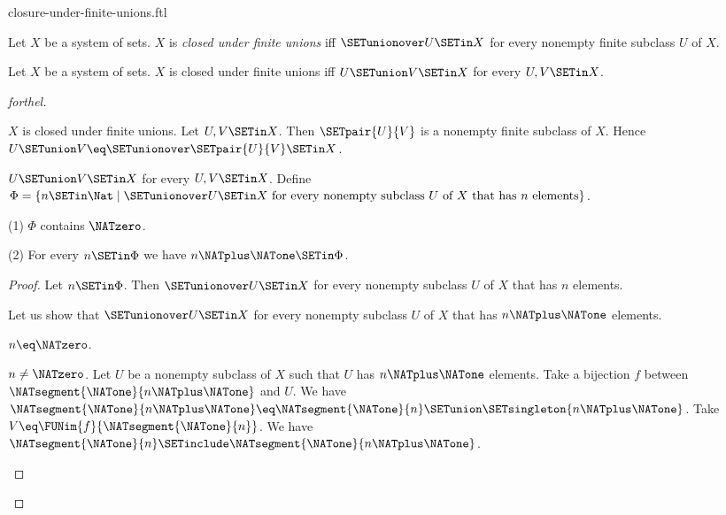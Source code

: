 \documentclass{naproche-library}
\begin{document}
\begin{smodule}[title=Closure Under Finite Unions]{closure-under-finite-unions.ftl}

\begin{definition}[forthel,id=FOUNDATIONS_14_7040118193913856]
  Let $X$ be a system of sets.
  $X$ is \emph{closed under finite unions} iff $\SETunionover U \SETin X$ for every nonempty finite subclass $U$ of $X$.
\end{definition}

\begin{proposition}[forthel,id=FOUNDATIONS_17_4164024962908160]
  Let $X$ be a system of sets.
  $X$ is closed under finite unions iff $U \SETunion V \SETin X$ for every $U, V \SETin X$.
\end{proposition}
\begin{proof}[forthel]
  \begin{case}{$X$ is closed under finite unions.}
    Let $U, V \SETin X$.
    Then $\SETpair{U}{V}$ is a nonempty finite subclass of $X$.
    Hence $U \SETunion V \eq \SETunionover \SETpair{U}{V} \SETin X$.
  \end{case}

  \begin{case}{$U \SETunion V \SETin X$ for every $U, V \SETin X$.}
    Define $\Phi = \{ n \SETin \Nat \mid \SETunionover U \SETin X\text{ for every nonempty subclass }U\text{ of }X\text{ that has }n\text{ elements}\}$.

    (1) $\Phi$ contains $\NATzero$.

    (2) For every $n \SETin \Phi$ we have $n \NATplus \NATone \SETin \Phi$.
    \begin{proof}
      Let $n \SETin \Phi$.
      Then $\SETunionover U \SETin X$ for every nonempty subclass $U$ of $X$ that has $n$ elements.

      Let us show that $\SETunionover U \SETin X$ for every nonempty subclass $U$ of $X$ that has $n \NATplus \NATone$ elements.

        \begin{case}{$n \eq \NATzero$.} \end{case}

        \begin{case}{$n \neq \NATzero$.}
          Let $U$ be a nonempty subclass of $X$ such that $U$ has $n \NATplus \NATone$ elements.
          Take a bijection $f$ between $\NATsegment{\NATone}{n \NATplus \NATone}$ and $U$.
          We have $\NATsegment{\NATone}{n \NATplus \NATone} \eq \NATsegment{\NATone}{n} \SETunion \SETsingleton{n \NATplus \NATone}$.
          Take $V \eq \FUNim{f}{\NATsegment{\NATone}{n}}$.
          We have $\NATsegment{\NATone}{n} \SETinclude \NATsegment{\NATone}{n \NATplus \NATone}$.


\end{case}
\end{proof}
\end{case}
\end{proof}
\end{smodule}
\end{document}
